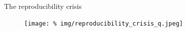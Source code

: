 \begin{frame}{The reproducibility crisis}

  \begin{figure}
    \centering
    \texttt{[image: \%
    img/reproducibility\_crisis\_q.jpeg]} %
  \end{figure}
  

  
  
\end{frame}
